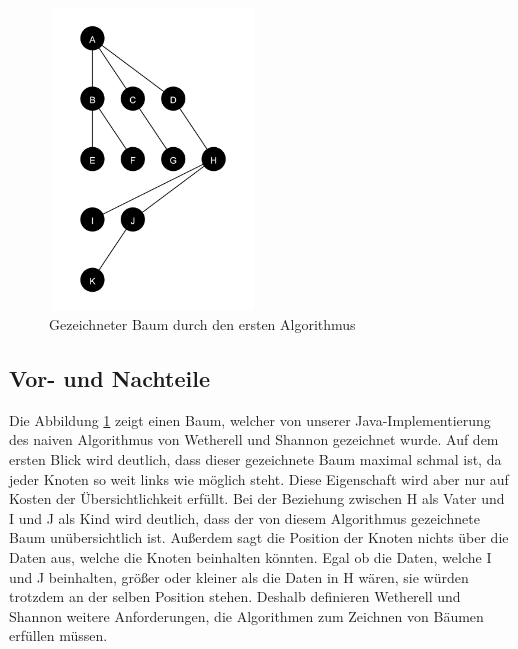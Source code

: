 \begin{figure}[H]
    \centering
    \includegraphics[width=5.5cm, height=8cm]{abbildungen/baum_algo_1}
    \caption{Gezeichneter Baum durch den ersten Algorithmus}
    \label{pic:baum_algo_1} 
\end{figure}

\subsection{Vor- und Nachteile}
Die Abbildung \ref{pic:baum_algo_1} zeigt einen Baum, welcher von unserer Java-Implementierung des naiven Algorithmus von Wetherell und Shannon
gezeichnet wurde.
Auf dem ersten Blick wird deutlich, dass dieser gezeichnete Baum maximal schmal ist, da jeder Knoten so weit links wie möglich steht.
Diese Eigenschaft wird aber nur auf Kosten der Übersichtlichkeit erfüllt. Bei der Beziehung zwischen H als Vater und I und J als Kind wird 
deutlich, dass der von diesem Algorithmus gezeichnete Baum unübersichtlich ist. Außerdem sagt die Position der Knoten nichts über die Daten 
aus, welche die Knoten beinhalten könnten. Egal ob die Daten, welche I und J beinhalten, größer oder kleiner als die Daten in H wären, 
sie würden trotzdem an der selben Position stehen. 
Deshalb definieren Wetherell und Shannon weitere Anforderungen, die Algorithmen zum Zeichnen von Bäumen erfüllen müssen.


